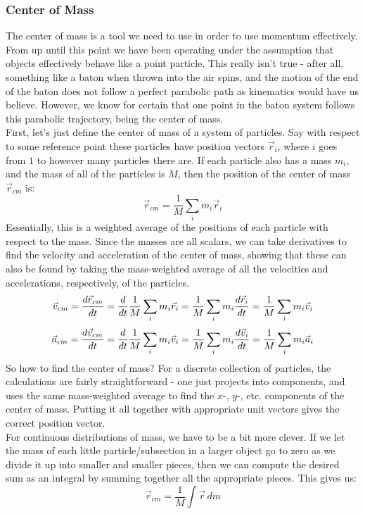 \subsubsection{Center of Mass}
The center of mass is a tool we need to use in order to use momentum effectively. From up until this point we have been operating under the assumption that objects effectively behave like a point particle. This really isn't true - after all, something like a baton when thrown into the air spins, and the motion of the end of the baton does not follow a perfect parabolic path as kinematics would have us believe. However, we know for certain that one point in the baton system follows this parabolic trajectory, being the center of mass. \\
First, let's just define the center of mass of a system of particles. Say with respect to some reference point these particles have position vectors $\vec r_i$, where $i$ goes from $1$ to however many particles there are. If each particle also has a mass $m_i$, and the mass of all of the particles is $M$, then the position of the center of mass $\vec r_{cm}$ is: 
\[
	\vec r_{cm} = \frac{1}{M} \sum_i m_i\vec r_i
\]
Essentially, this is a weighted average of the positions of each particle with respect to the mass. Since the masses are all scalars, we can take derivatives to find the velocity and acceleration of the center of mass, showing that these can also be found by taking the mass-weighted average of all the velocities and accelerations, respectively, of the particles. 
\[
	\vec v_{cm} = \frac{d \vec r_{cm}}{d t} = \frac{d }{d t} \frac{1}{M} \sum_i m_i \vec r_i = \frac{1}{M} \sum_i m_i \frac{d \vec r_i}{d t} = \frac{1}{M} \sum_i m_i \vec v_i
\]
\[
	\vec a_{cm} = \frac{d \vec v_{cm}}{d t} = \frac{d }{d t} \frac{1}{M} \sum_i m_i \vec v_i = \frac{1}{M} \sum_i m_i \frac{d \vec v_i}{d t} = \frac{1}{M} \sum_i m_i \vec a_i
\]
So how to find the center of mass? For a discrete collection of particles, the calculations are fairly straightforward - one just projects into components, and uses the same mass-weighted average to find the $x$-, $y$-, etc. components of the center of mass. Putting it all together with appropriate unit vectors gives the correct position vector. \\
For continuous distributions of mass, we have to be a bit more clever. If we let the mass of each little particle/subsection in a larger object go to zero as we divide it up into smaller and smaller pieces, then we can compute the desired sum as an integral by summing together all the appropriate pieces. This gives us:
\[
	\vec r_{cm} = \frac{1}{M} \int \vec r \, dm
\]
